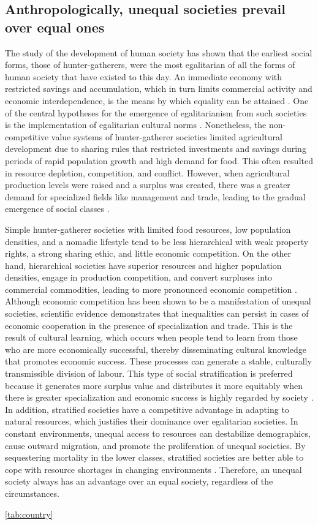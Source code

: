 \subsection{Anthropologically, unequal societies prevail over equal ones}

The study of the development of human society has shown that the earliest social forms, those of hunter-gatherers, were the most egalitarian of all the forms of human society that have existed to this day. An immediate economy with restricted savings and accumulation, which in turn limits commercial activity and economic interdependence, is the means by which equality can be attained \parencite{woodburn1982egalitarian}. One of the central hypotheses for the emergence of egalitarianism from such societies is the implementation of egalitarian cultural norms \parencite{boehm2009hierarchy}. Nonetheless, the non-competitive value systems of hunter-gatherer societies limited agricultural development due to sharing rules that restricted investments and savings during periods of rapid population growth and high demand for food. This often resulted in resource depletion, competition, and conflict. However, when agricultural production levels were raised and a surplus was created, there was a greater demand for specialized fields like management and trade, leading to the gradual emergence of social classes \parencite{carneiro1970theory}.

Simple hunter-gatherer societies with limited food resources, low population densities, and a nomadic lifestyle tend to be less hierarchical with weak property rights, a strong sharing ethic, and little economic competition. On the other hand, hierarchical societies have superior resources and higher population densities, engage in production competition, and convert surpluses into commercial commodities, leading to more pronounced economic competition \parencite{hayden2001richman}. Although economic competition has been shown to be a manifestation of unequal societies, scientific evidence demonstrates that inequalities can persist in cases of economic cooperation in the presence of specialization and trade. This is the result of cultural learning, which occurs when people tend to learn from those who are more economically successful, thereby disseminating cultural knowledge that promotes economic success. These processes can generate a stable, culturally transmissible division of labour. This type of social stratification is preferred because it generates more surplus value and distributes it more equitably when there is greater specialization and economic success is highly regarded by society \parencite{henrich2008division}. In addition, stratified societies have a competitive advantage in adapting to natural resources, which justifies their dominance over egalitarian societies. In constant environments, unequal access to resources can destabilize demographics, cause outward migration, and promote the proliferation of unequal societies. By sequestering mortality in the lower classes, stratified societies are better able to cope with resource shortages in changing environments \parencite{rogers2011spread}. Therefore, an unequal society always has an advantage over an equal society, regardless of the circumstances.


\ref{tab:country}